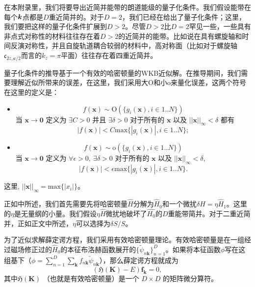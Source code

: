 \begin{appendices}
在本附录里，我们将要导出近简并能带的朗道能级的量子化条件。我们假设能带在每个$\boldsymbol{k}$点都是$D$重近简并的。对于$D=2$，我们已经在给出了量子化条件；这里，我们要把这样的量子化条件扩展到$D>2$。尽管$D>2$比$D=2$罕见一些，一些具有非点式对称性的材料往往存在着$D>2$的近简并的能带。比如说在具有螺旋轴和时间反演对称性，并且自旋轨道耦合较弱的材料中，高对称面（比如对于螺旋轴$\mathfrak{c}_{2z,\boldsymbol{c}/2}$而言的$k_z=\pi$平面）往往存在着四重近简并。

量子化条件的推导基于一个有效的哈密顿量的WKB近似解。在推导期间，我们需要理解近似所带来的误差，在这里，我们采用大O和小o来量化误差，这两个符号在这里的定义是： 
\begin{itemize}
    \item 
    \begin{equation}
        f(\boldsymbol{x})\sim\text{O}(\{g_i(\boldsymbol{x}), i\in 1..N\})
    \end{equation}
    当 $\boldsymbol{x}\to\boldsymbol{0}$ 定义为 $\exists C>0$ 并且 $\exists \delta>0$ 对于所有的 $\boldsymbol{x}$ 以及 $||\boldsymbol{x}||_\infty<\delta$ 都有
    \begin{equation}
        |f(\boldsymbol{x})|<C\text{max}\{|g_i(\boldsymbol{x})|, i\in 1..N\};
    \end{equation}
    \item 
    \begin{equation}
        f(\boldsymbol{x})\sim\text{o}(\{g_i(\boldsymbol{x}), i\in 1..N\})
    \end{equation}
    当 $\boldsymbol{x}\to\boldsymbol{0}$ 定义为 $\forall \epsilon>0,~\exists \delta>0$ 对于所有的 $\boldsymbol{x}$ 以及 $||\boldsymbol{x}||_\infty<\delta$,
    \begin{equation}
        |f(\boldsymbol{x})|<\epsilon\text{max}\{|g_i(\boldsymbol{x})|, i\in 1..N\}.
    \end{equation}
\end{itemize}
这里, $||\boldsymbol{x}||_\infty=\text{max}\{|x_i|\}$。

正如中所述，我们首先需要先将哈密顿量$\hat{H}$分解为$\hat{H}_0$和一个微扰$\delta\hat{H}=\eta\hat{H}_1$。这里的$\eta$是无量纲的小量。我们假设$\eta\hat{H}$微扰地破坏了$\hat{H_0}$的$D$重能带简并。对于二重近简并，正如正文中所述，$\eta$可以选择为$\delta S/S$。

为了近似求解薛定谔方程，我们采用有效哈密顿量理论\cite{rotheffham,100p}。有效哈密顿量是在一组经过磁场修正过的$\hat{H}_0$的本征布洛赫函数展开的\cite{rotheffham}$\{\tilde{\psi}_{n\boldsymbol{k}}\}_{n=1}^D$。如果将本征函数$\phi$写在这组基下（$\phi=\sum_{n=1}^D\sum_{\boldsymbol{k}}f_{n\boldsymbol{k}}\tilde{\psi}_{n\boldsymbol{k}}$），那么薛定谔方程就成为
\begin{equation}
(\mathfrak{H}(\boldsymbol{K})-E)\boldsymbol{f}_{\boldsymbol{k}}=0,\label{eq:schrodinger}
\end{equation}
其中$\mathfrak{H}(\boldsymbol{K})$ （也就是有效哈密顿量）是一个 $D\times D$ 的矩阵微分算符。 


\end{appendices}

